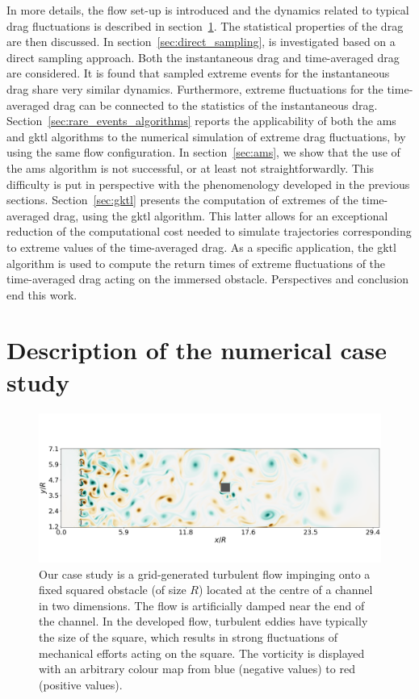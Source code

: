 \documentclass{jfm}
\newcommand{\EL}[1]{{\color{myred}{#1}}}
\begin{document}
In more details,  the flow set-up is introduced and the dynamics related to typical
drag fluctuations is described in section~\ref{sec:test_flow}.
The statistical properties of the drag are then discussed.
In section~\ref{sec:direct_sampling}, \EL{the phenomenology of  extreme
	drag fluctuations} is investigated based on a direct sampling approach.
Both the instantaneous drag and time-averaged drag are considered.
It is found that sampled extreme events for the instantaneous drag share very similar dynamics. Furthermore, extreme fluctuations for the time-averaged drag can be connected to the statistics of the instantaneous drag.
Section~\ref{sec:rare_events_algorithms} reports the applicability of both the \ac{ams} and \ac{gktl} algorithms to the numerical simulation of extreme drag fluctuations, by using the same flow configuration.
In section~\ref{sec:ams}, we show that the use of the \ac{ams} algorithm is not successful, or at least not straightforwardly. This difficulty is put in perspective with the phenomenology developed in the previous sections.
Section~\ref{sec:gktl} presents the computation of extremes of the time-averaged drag, using the \ac{gktl} algorithm.
This latter allows for an exceptional reduction of the computational cost needed to simulate trajectories corresponding to extreme values of the time-averaged drag.
As a specific \EL{successful} application, the \ac{gktl} algorithm is used to compute the return times of extreme fluctuations of the time-averaged drag acting on the immersed obstacle.
Perspectives and conclusion end this work.

\section{Description of the numerical case study}
\label{sec:test_flow}

\begin{figure}
	\centering
	\includegraphics[width=\linewidth]{illustr_ecoulement/illustr_ecoulement}
	\caption{Our case study is a grid-generated turbulent flow impinging onto a fixed squared obstacle (of size $R$) located at the centre of a channel in two dimensions. The flow is artificially damped near the end of the channel. In the developed flow, turbulent eddies have typically the size of the square, which results in strong fluctuations of mechanical efforts acting on the square. The vorticity is displayed with an arbitrary colour map from blue (negative values) to red (positive values).}
	\label{fig:illustr_ecoulement}
\end{figure}
\end{document}
